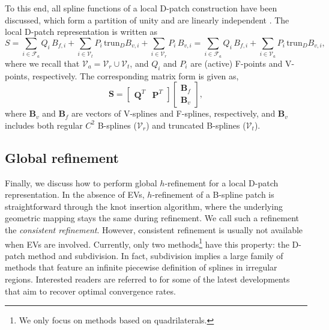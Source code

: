 \documentclass[graybox]{svmult}
\begin{document}
To this end, all spline functions of a local D-patch construction have been discussed, which form a partition of unity and are linearly independent \cite{ref:casquero20}. The local D-patch representation is written as
\begin{equation}
S = \sum_{i\in\mathcal{F}_a} Q_i \, B_{f\!,i} + \sum_{i\in\mathcal{V}_{t}} P_i \, \mathrm{trun}_D B_{v,i} + \sum_{i\in\mathcal{V}_{r}} P_i \, B_{v,i} = \sum_{i\in\mathcal{F}_a} Q_i \, B_{f\!,i} + \sum_{i\in\mathcal{V}_a} P_i \, \mathrm{trun}_D B_{v,i},
\label{eq:surf_dpatch}
\end{equation}
where we recall that $\mathcal{V}_a = \mathcal{V}_r \cup \mathcal{V}_t$, and $Q_i$ and $P_i$ are (active) F-points and V-points, respectively.
The corresponding matrix form is given as,
\begin{equation}
\bm{S} =
\begin{bmatrix}
\bm{Q}^T & \bm{P}^T
\end{bmatrix} 
\begin{bmatrix}
\bm{B}_f \\ \bm{B}_v
\end{bmatrix},
\label{eq:dpatch_rep_glb}
\end{equation}
where $\bm{B}_v$ and $\bm{B}_f$ are vectors of V-splines and F-splines, respectively, and $\bm{B}_v$ includes both regular $C^2$ B-splines ($\mathcal{V}_r$) and truncated B-splines ($\mathcal{V}_t$).

\subsection{Global refinement}
\label{sec:glb_refine}

Finally, we discuss how to perform global $h$-refinement for a local D-patch representation. In the absence of EVs, $h$-refinement of a B-spline patch is straightforward through the knot insertion algorithm, where the underlying geometric mapping stays the same during refinement. We call such a refinement the \emph{consistent refinement}. However, consistent refinement is usually not available when EVs are involved. Currently, only two methods\footnote{We only focus on methods based on quadrilaterals.} have this property: the D-patch method and subdivision. In fact, subdivision implies a large family of methods that feature an infinite piecewise definition of splines in irregular regions. Interested readers are referred to \cite{ref:xli19, ref:wei20} for some of the latest developments that aim to recover optimal convergence rates.
\end{document}
